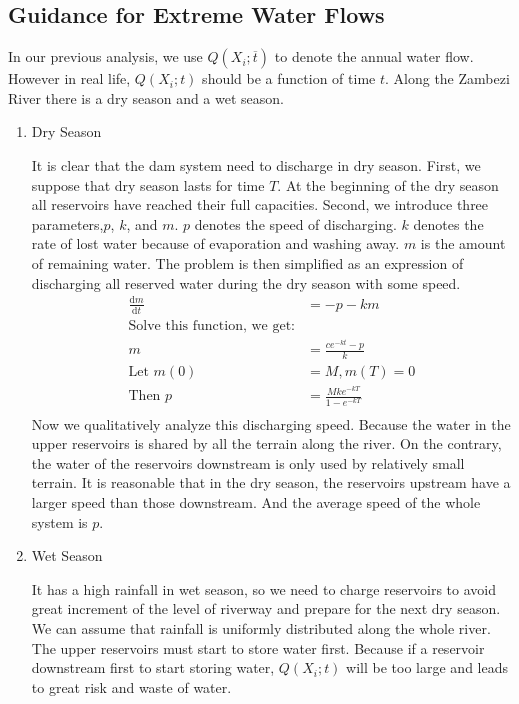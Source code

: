 \documentclass{mcmthesis}
\begin{document}
\subsection{Guidance for Extreme Water Flows}
In our previous analysis, we use $Q(X_i;\overline{t})$ to denote the annual water flow. However in real life, $Q(X_i;t)$ should be a function of time $t$. Along the Zambezi River there is a dry season and a wet season.
\begin{enumerate}
\item Dry Season

It is clear that the dam system need to discharge in dry season. First, we suppose that dry season lasts for time $T$. At the beginning of the dry season all reservoirs have reached their full capacities. Second, we introduce three parameters,$p$, $k$, and $m$. $p$ denotes the speed of discharging. $k$ denotes the rate of lost water because of evaporation and washing away. $m$ is the amount of remaining water. The problem is then simplified as an expression of discharging all reserved water during the dry season with some speed.
\begin{align*}
\frac{\mathrm{d}m}{\mathrm{d}t} & = -p-km\\
\text{Solve this function, we get:}\\
m & = \frac{ce^{-kt}-p}{k}\\
\text{Let } m(0) &= M , m(T) = 0 \\
\text{Then } p&=\frac{Mke^{-kT}}{1-e^{-kT}}\\
\end{align*}
Now we qualitatively analyze this discharging speed. Because the water in the upper reservoirs is shared by all the terrain along the river. On the contrary, the water of the reservoirs downstream is only used by relatively small terrain. It is reasonable that in the dry season, the reservoirs upstream have a larger speed than those downstream. And the average speed of the whole system is $p$.

\item Wet Season

It has a high rainfall in wet season, so we need to charge reservoirs to avoid great increment of the level of riverway and prepare for the next dry season. We can assume that rainfall is uniformly distributed along the whole river. The upper reservoirs must start to store water first. Because if a reservoir downstream first to start storing water, $Q(X_i;t)$ will be too large and leads to great risk and waste of water.

\end{enumerate}
\end{document}
